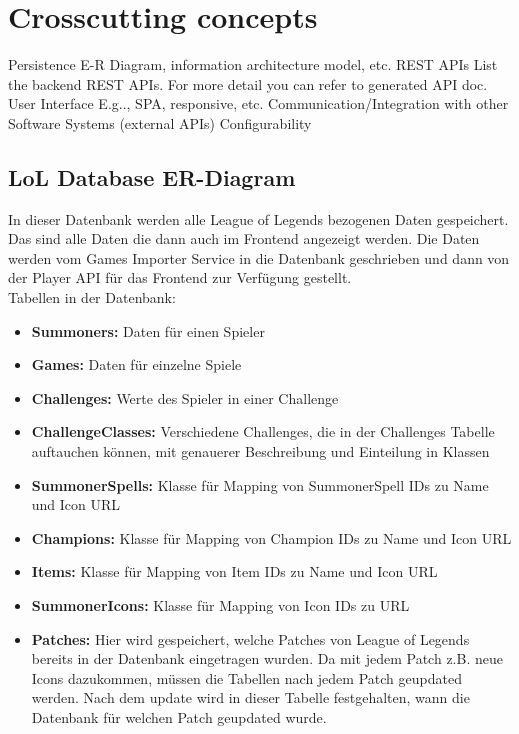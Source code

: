 \section{Crosscutting concepts}
Persistence 
E-R Diagram, information architecture model, etc.
REST APIs
List the backend REST APIs. For more detail you can refer to generated API doc.
User Interface
E.g.., SPA, responsive, etc.
Communication/Integration with other Software Systems (external APIs)
Configurability

\subsection{LoL Database ER-Diagram}
In dieser Datenbank werden alle League of Legends bezogenen Daten gespeichert. Das sind alle Daten die dann auch im Frontend angezeigt werden. Die Daten werden vom Games Importer Service in die Datenbank geschrieben und dann von der Player API für das Frontend zur Verfügung gestellt.\\
Tabellen in der Datenbank:\\
\begin{itemize}
\item \textbf{Summoners:} Daten für einen Spieler
\item \textbf{Games:} Daten für einzelne Spiele
\item \textbf{Challenges:} Werte des Spieler in einer Challenge
\item \textbf{ChallengeClasses:} Verschiedene Challenges, die in der Challenges Tabelle auftauchen können, mit genauerer Beschreibung und Einteilung in Klassen
\item \textbf{SummonerSpells:} Klasse für Mapping von SummonerSpell IDs zu Name und Icon URL
\item \textbf{Champions:} Klasse für Mapping von Champion IDs zu Name und Icon URL
\item \textbf{Items:} Klasse für Mapping von Item IDs zu Name und Icon URL
\item \textbf{SummonerIcons:} Klasse für Mapping von Icon IDs zu URL
\item \textbf{Patches:} Hier wird gespeichert, welche Patches von League of Legends bereits in der Datenbank eingetragen wurden. Da mit jedem Patch z.B. neue Icons dazukommen, müssen die Tabellen nach jedem Patch geupdated werden. Nach dem update wird in dieser Tabelle festgehalten, wann die Datenbank für welchen Patch geupdated wurde.
\end{itemize}

